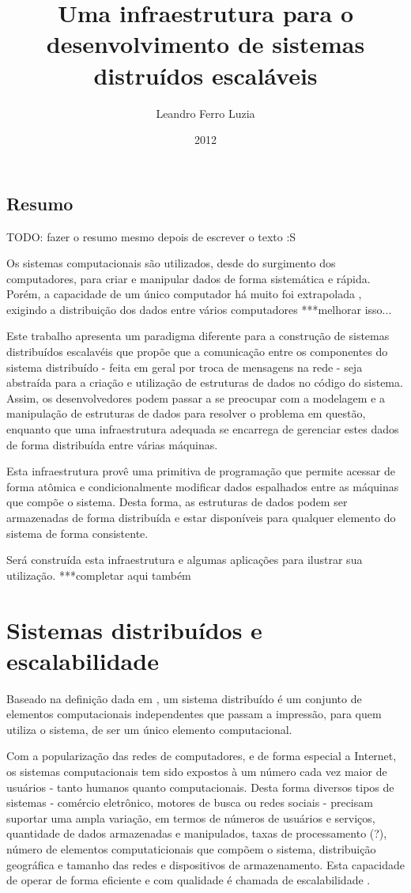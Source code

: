 \documentclass[a4paper,12pt]{report}
\title{Uma infraestrutura para o desenvolvimento de sistemas distruídos escaláveis}
\author{Leandro Ferro Luzia}
\date{2012}
\begin{document}
\pagestyle{headings}
\maketitle
\section*{Resumo}
TODO: fazer o resumo mesmo depois de escrever o texto :S

Os sistemas computacionais são utilizados, desde do surgimento dos computadores, para criar e manipular dados de forma sistemática e rápida. Porém, a capacidade de um único computador há muito foi extrapolada , exigindo a distribuição dos dados entre vários computadores ***melhorar isso...

Este trabalho apresenta um paradigma diferente para a construção de sistemas distribuídos escalavéis que propõe que a comunicação entre os componentes do sistema distribuído - feita em geral por troca de mensagens na rede - seja abstraída para a criação e utilização de estruturas de dados no código do sistema. Assim, os desenvolvedores podem passar a se preocupar com a modelagem e a manipulação de estruturas de dados para resolver o problema em questão, enquanto que uma infraestrutura adequada se encarrega de gerenciar estes dados de forma distribuída entre várias máquinas.

Esta infraestrutura provê uma primitiva de programação que permite acessar de forma atômica e condicionalmente modificar dados espalhados entre as máquinas que compõe o sistema. Desta forma, as estruturas de dados podem ser armazenadas de forma distribuída e estar disponíveis para qualquer elemento do sistema de forma consistente.

Será construída esta infraestrutura e algumas aplicações para ilustrar sua utilização. ***completar aqui também
\tableofcontents
\listoftables
\listoffigures
\chapter{Sistemas distribuídos e escalabilidade}
Baseado na definição dada em \cite{ds-tanenbaum}, um sistema distribuído é um conjunto de elementos computacionais independentes que passam a impressão, para quem utiliza o sistema, de ser um único elemento computacional.

Com a popularização das redes de computadores, e de forma especial a Internet, os sistemas computacionais tem sido expostos à um número cada vez maior de usuários - tanto humanos quanto computacionais. Desta forma diversos tipos de sistemas - comércio eletrônico, motores de busca ou redes sociais - precisam suportar uma ampla variação, em termos de números de usuários e serviços, quantidade de dados armazenadas e manipulados, taxas de processamento (?), número de elementos computaticionais que compõem o sistema, distribuição geográfica e tamanho das redes e dispositivos de armazenamento. Esta capacidade de operar de forma eficiente e com qualidade é chamada de escalabilidade \cite{evaluating-scalability}.
\end{document}
